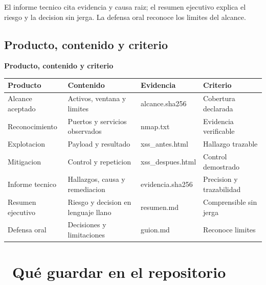 \documentclass[11pt,a4paper]{article}
\newcommand{\iconotexto}[2]{\textcolor{cyanNeon}{\faIcon{#1}}~#2}
\begin{document}
El informe tecnico cita evidencia y causa raiz; el resumen ejecutivo explica el riesgo y la decision sin jerga. La defensa oral reconoce los limites del alcance.

\subsection{Producto, contenido y criterio}

\begin{center}
\begin{minipage}{\linewidth}
\centering
{\footnotesize
\textbf{Producto, contenido y criterio}\par\smallskip
\begin{tabular}{@{}>{\raggedright\arraybackslash}p{2.40cm}>{\raggedright\arraybackslash}p{4.20cm}>{\raggedright\arraybackslash}p{2.80cm}>{\raggedright\arraybackslash}p{3.60cm}@{}}
\toprule
\textbf{Producto} & \textbf{Contenido} & \textbf{Evidencia} & \textbf{Criterio} \\
\midrule
Alcance aceptado & Activos, ventana y limites & alcance.sha256 & Cobertura declarada \\
Reconocimiento & Puertos y servicios observados & nmap.txt & Evidencia verificable \\
Explotacion & Payload y resultado & xss\_antes.html & Hallazgo trazable \\
Mitigacion & Control y repeticion & xss\_despues.html & Control demostrado \\
Informe tecnico & Hallazgos, causa y remediacion & evidencia.sha256 & Precision y trazabilidad \\
Resumen ejecutivo & Riesgo y decision en lenguaje llano & resumen.md & Comprensible sin jerga \\
Defensa oral & Decisiones y limitaciones & guion.md & Reconoce limites \\
\bottomrule
\end{tabular}
}
\par{}
\end{minipage}
\end{center}

\section{\iconotexto{box-open}{Qué guardar en el repositorio}}
\end{document}

